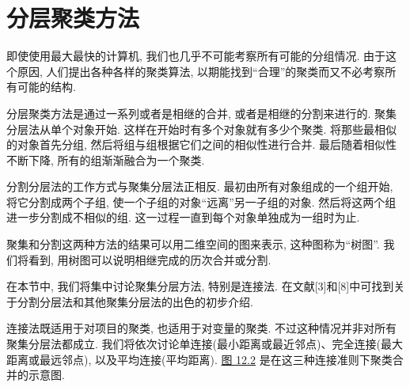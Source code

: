 
\section{分层聚类方法}
\label{sec:12.3}

即使使用最大最快的计算机, 我们也几乎不可能考察所有可能的分组情况. 由于这个原因, 人们提出各种各样的聚类算法, 以期能找到“合理”的聚类而又不必考察所有可能的结构.

分层聚类方法是通过一系列或者是相继的合并, 或者是相继的分割来进行的. 聚集分层法从单个对象开始. 这样在开始时有多个对象就有多少个聚类. 将那些最相似的对象首先分组, 然后将组与组根据它们之间的相似性进行合并. 最后随着相似性不断下降, 所有的组渐渐融合为一个聚类.

分割分层法的工作方式与聚集分层法正相反. 最初由所有对象组成的一个组开始, 将它分割成两个子组, 使一个子组的对象“远离”另一子组的对象. 然后将这两个组进一步分割成不相似的组. 这一过程一直到每个对象单独成为一组时为止.

聚集和分割这两种方法的结果可以用二维空间的图来表示, 这种图称为“树图”. 我们将看到, 用树图可以说明相继完成的历次合并或分割.

在本节中, 我们将集中讨论聚集分层方法, 特别是连接法. 在文献[3]和[8]中可找到关于分割分层法和其他聚集分层法的出色的初步介绍.

连接法既适用于对项目的聚类, 也适用于对变量的聚类. 不过这种情况并非对所有聚集分层法都成立. 我们将依次讨论单连接(最小距离或最近邻点)、完全连接(最大距离或最远邻点), 以及平均连接(平均距离). \hyperref[fig:12.2]{图 12.2} 是在这三种连接准则下聚类合并的示意图.

